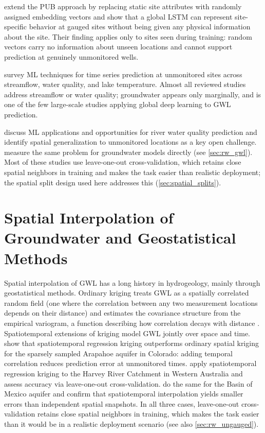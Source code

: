 \citet{li2022regionalization} extend the PUB approach by replacing static site attributes with randomly assigned embedding vectors and show that a global LSTM can represent
site-specific behavior at gauged sites without being given any physical information about the site. Their finding applies only to sites seen during training: random vectors carry no information about unseen locations and cannot support prediction at genuinely unmonitored wells.

\citet{willard2023time} survey ML techniques for time series prediction at unmonitored sites across streamflow, water quality, and lake temperature. Almost all reviewed studies address streamflow or water quality; groundwater appears only marginally, and \citet{kunz2025} is one of the few large-scale studies applying global deep learning to GWL prediction.

\citet{varadharajan2022machine} discuss ML applications and opportunities for river water quality prediction and identify spatial generalization to unmonitored locations as a key open challenge. \citet{heudorfer2024challenges} measure the same problem for groundwater models directly (see \cref{sec:rw_gwl}). Most of these studies use leave-one-out cross-validation, which retains close spatial neighbors in training and makes the task easier than realistic deployment; the spatial split design used here addresses this (\cref{sec:spatial_splits}).

\section{Spatial Interpolation of Groundwater and Geostatistical Methods}
\label{sec:rw_gwl_interp}

Spatial interpolation of GWL has a long history in hydrogeology, mainly through geostatistical methods. Ordinary kriging treats GWL as a spatially correlated random field (one where the correlation between any two measurement locations depends on their distance) and estimates the covariance structure from the empirical variogram, a function describing how correlation decays with distance \citep{rasmussen2006gaussian}.
Spatiotemporal extensions of kriging model GWL jointly over space and time. \citet{ruybal2019evaluation} show that spatiotemporal regression kriging outperforms ordinary spatial kriging for the sparsely sampled Arapahoe aquifer in Colorado: adding temporal correlation reduces prediction error at unmonitored times. \citet{kazemi2021evaluation} apply spatiotemporal regression kriging to the Harvey River Catchment in Western Australia and assess accuracy via leave-one-out cross-validation. \citet{junezferreira2023assessment} do the same for the Basin of Mexico aquifer and confirm that spatiotemporal interpolation yields smaller errors than independent spatial snapshots. In all three cases, leave-one-out cross-validation retains close spatial neighbors in training, which makes the task easier than it would be in a realistic deployment scenario \citep{roberts2017cross} (see also \cref{sec:rw_ungauged}).

